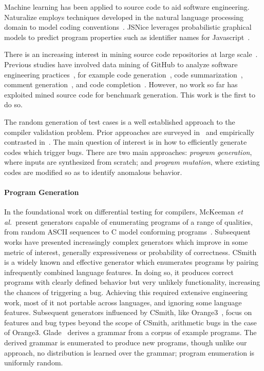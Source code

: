 Machine learning has been applied to source code to aid software engineering. Naturalize employs techniques developed in the natural language processing domain to model coding conventions~\cite{Allamanis2014a}. JSNice leverages probabilistic graphical models to predict program properties such as identifier names for Javascript~\cite{Raychev}.

There is an increasing interest in mining source code repositories at large scale~\cite{Allamanis2013a,White2015a,Bird2009}. Previous studies have involved data mining of GitHub to analyze software engineering practices~\cite{Wu2014,Guzman2014,Baishakhi2014a,Vasilescu2015}, for example code generation~\cite{Zhang2015a}, code summarization~\cite{Allamanis2016}, comment generation~\cite{Wong2013}, and code completion~\cite{Raychev2014}. However, no work so far has exploited mined source code for benchmark generation. This work is the first to do so.



The random generation of test cases is a well established approach to the
compiler validation problem. Prior approaches are surveyed
in~\cite{Kossatchev2005,Boujarwah1997} and empirically contrasted
in~\cite{Chen2014a}. The main question of interest is in how to efficiently
generate codes which trigger bugs. There are two main approaches: \emph{program
	generation}, where inputs are synthesized from scratch; and \emph{program
	mutation}, where existing codes are modified so as to identify anomalous
behavior.

\paragraph{Program Generation}

In the foundational work on differential testing for compilers, McKeeman
\emph{et al.\ }present generators capable of enumerating programs of a range of
qualities, from random ASCII sequences to C model conforming
programs~\cite{McKeeman1998}. Subsequent works have presented increasingly
complex generators which improve in some metric of interest, generally
expressiveness or probability of correctness. CSmith~\cite{Yang2011} is a widely
known and effective generator which enumerates programs by pairing infrequently
combined language features. In doing so, it produces correct programs with
clearly defined behavior but very unlikely functionality, increasing the chances
of triggering a bug. Achieving this required extensive engineering work, most of
it not portable across languages, and ignoring some language features.
Subsequent generators influenced by CSmith, like Orange3~\cite{Nagai2013}, focus
on features and bug types beyond the scope of CSmith, arithmetic bugs in the
case of Orange3. Glade~\cite{Bastani2017} derives a grammar from a corpus of
example programs. The derived grammar is enumerated to produce new programs,
though unlike our approach, no distribution is learned over the grammar; program
enumeration is uniformly random.

